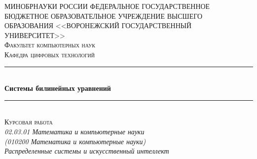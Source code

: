 \begin{titlepage}
\newcommand{\HRule}{\rule{\linewidth}{0.5mm}} %

\center %
 

\textsc{МИНОБРНАУКИ РОССИИ ФЕДЕРАЛЬНОЕ ГОСУДАРСТВЕННОЕ БЮДЖЕТНОЕ ОБРАЗОВАТЕЛЬНОЕ
УЧРЕЖДЕНИЕ ВЫСШЕГО ОБРАЗОВАНИЯ <<ВОРОНЕЖСКИЙ ГОСУДАРСТВЕННЫЙ УНИВЕРСИТЕТ>>
}\\[1.5cm] %
\textsc{Факультет компьютерных наук}\\ %
\textsc{Кафедра цифровых технологий}\\[1.0cm]


\HRule \\[0.4cm]
{ \huge \bfseries Системы билинейных уравнений}\\[0.4cm] %
\HRule \\[1.5cm]

\textsc{Курсовая работа}\\[0.2cm]
\textit{02.03.01 Математика и компьютерные науки}\\
\textit{\small(010200 Математика и компьютерные науки)}\\[0.2cm]
\textit{Распределенные системы и искусственный интеллект}\\[4.0cm]



\end{titlepage}

